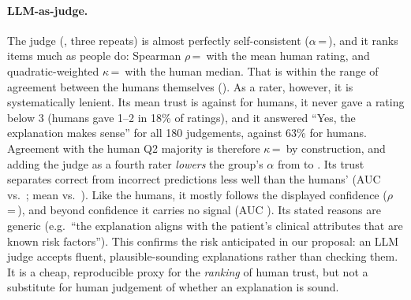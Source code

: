 \paragraph{LLM-as-judge.} The judge (\LLMModel{}, three repeats) is almost perfectly self-consistent ($\alpha$\,=\,\LLMSelfAlpha{}), and it ranks items much as people do: Spearman $\rho$\,=\,\LLMvsHumanRho{} with the mean human rating, and quadratic-weighted $\kappa$\,=\,\LLMvsHumanQWK{} with the human median. That is within the range of agreement between the humans themselves (\PairQWKRange{}). As a rater, however, it is systematically lenient. Its mean trust is \MeanTrustLLM{} against \MeanTrustHuman{} for humans, it never gave a rating below 3 (humans gave 1--2 in 18\% of ratings), and it answered ``Yes, the explanation makes sense'' for all 180 judgements, against 63\% for humans. Agreement with the human Q2 majority is therefore $\kappa$\,=\,\LLMvsHumanSenseKappa{} by construction, and adding the judge as a fourth rater \emph{lowers} the group's $\alpha$ from \AlphaTrust{} to \AlphaTrustWithLLM{}. Its trust separates correct from incorrect predictions less well than the humans' (AUC \AUCLLM{} vs.\ \AUCHuman{}; mean \LLMTrustCorrect{} vs.\ \LLMTrustIncorrect{}). Like the humans, it mostly follows the displayed confidence ($\rho$\,=\,\RhoLLMConf{}), and beyond confidence it carries no signal (AUC \AUCLLMResid{}). Its stated reasons are generic (e.g.\ ``the explanation aligns with the patient's clinical attributes that are known risk factors''). This confirms the risk anticipated in our proposal: an LLM judge accepts fluent, plausible-sounding explanations rather than checking them. It is a cheap, reproducible proxy for the \emph{ranking} of human trust, but not a substitute for human judgement of whether an explanation is sound.
